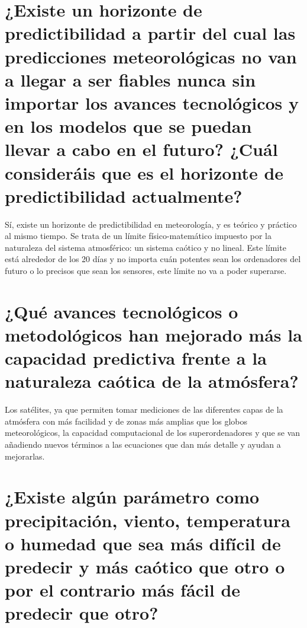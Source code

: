\documentclass[
  10pt,
  a4paper,
  DIV=11,
  numbers=noendperiod,
  open=any]{scrreprt}
\numberwithin{equation}{chapter}
\numberwithin{equation}{section}
\renewcommand{\[}{\begin{equation}}
\renewcommand{\]}{\end{equation}}
\begin{document}
\section{¿Existe un horizonte de predictibilidad a partir del cual las
predicciones meteorológicas no van a llegar a ser fiables nunca sin
importar los avances tecnológicos y en los modelos que se puedan llevar
a cabo en el futuro? ¿Cuál consideráis que es el horizonte de
predictibilidad
actualmente?}\label{existe-un-horizonte-de-predictibilidad-a-partir-del-cual-las-predicciones-meteoroluxf3gicas-no-van-a-llegar-a-ser-fiables-nunca-sin-importar-los-avances-tecnoluxf3gicos-y-en-los-modelos-que-se-puedan-llevar-a-cabo-en-el-futuro-cuuxe1l-consideruxe1is-que-es-el-horizonte-de-predictibilidad-actualmente}

Sí, existe un horizonte de predictibilidad en meteorología, y es teórico
y práctico al mismo tiempo. Se trata de un límite físico-matemático
impuesto por la naturaleza del sistema atmosférico: un sistema caótico y
no lineal. Este límite está alrededor de los 20 días y no importa cuán
potentes sean los ordenadores del futuro o lo precisos que sean los
sensores, este límite no va a poder superarse.

\section{¿Qué avances tecnológicos o metodológicos han mejorado más la
capacidad predictiva frente a la naturaleza caótica de la
atmósfera?}\label{quuxe9-avances-tecnoluxf3gicos-o-metodoluxf3gicos-han-mejorado-muxe1s-la-capacidad-predictiva-frente-a-la-naturaleza-cauxf3tica-de-la-atmuxf3sfera}

Los satélites, ya que permiten tomar mediciones de las diferentes capas
de la atmósfera con más facilidad y de zonas más amplias que los globos
meteorológicos, la capacidad computacional de los superordenadores y que
se van añadiendo nuevos términos a las ecuaciones que dan más detalle y
ayudan a mejorarlas.

\section{¿Existe algún parámetro como precipitación, viento, temperatura
o humedad que sea más difícil de predecir y más caótico que otro o por
el contrario más fácil de predecir que
otro?}\label{existe-alguxfan-paruxe1metro-como-precipitaciuxf3n-viento-temperatura-o-humedad-que-sea-muxe1s-difuxedcil-de-predecir-y-muxe1s-cauxf3tico-que-otro-o-por-el-contrario-muxe1s-fuxe1cil-de-predecir-que-otro}
\end{document}

